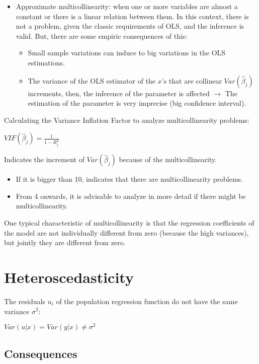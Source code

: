 \documentclass[10pt,landscape]{article}
\begin{document}
\begin{multicols}{3}
\begin{itemize}[leftmargin=*]
\item Approximate multicollinearity: when one or more variables are almost a constant or there is a linear relation between them. In this context, there is not a problem, given the classic requirements of OLS, and the inference is valid. But, there are some empiric consequences of this:
\begin{itemize}[leftmargin=*]
\item Small sample variations can induce to big variations in the OLS estimations.
\item The variance of the OLS estimator of the $x$'s that are collinear $Var(\hat{\beta}_j)$ increments, then, the inference of the parameter is affected $\rightarrow$ The estimation of the parameter is very imprecise (big confidence interval).
\end{itemize}
\end{itemize}

Calculating the Variance Inflation Factor to analyze multicollinearity problems:

$VIF(\hat{\beta}_j) = \frac{1}{1-R_j^2}$

Indicates the increment of $Var(\hat{\beta}_j)$ because of the multicollinearity.

\begin{itemize}[leftmargin=*]
\item If it is bigger than 10, indicates that there are multicollinearity problems.
\item From 4 onwards, it is advisable to analyze in more detail if there might be
multicollinearity.
\end{itemize}

One typical characteristic of multicollinearity is that the regression coefficients of the model are not individually different from zero (because the high variances), but jointly they are different from zero.

\columnbreak

\section*{Heteroscedasticity}

The residuals $u_i$ of the population regression function do not have the same variance $\sigma^2$:

$Var(u|x) = Var(y|x) \neq \sigma^2$

\subsection*{Consequences}


\end{multicols}
\end{document}
